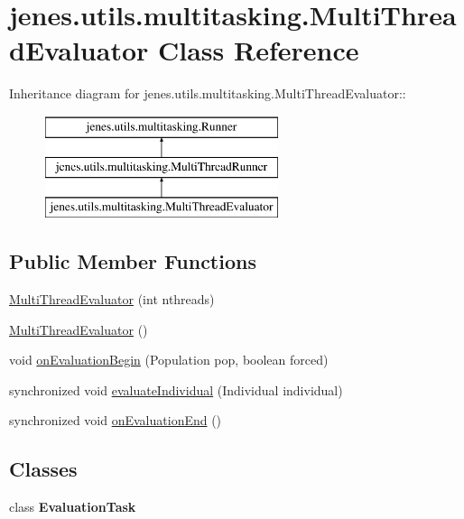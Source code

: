 \hypertarget{classjenes_1_1utils_1_1multitasking_1_1_multi_thread_evaluator}{
\section{jenes.utils.multitasking.MultiThreadEvaluator Class Reference}
\label{classjenes_1_1utils_1_1multitasking_1_1_multi_thread_evaluator}
}
Inheritance diagram for jenes.utils.multitasking.MultiThreadEvaluator::\begin{figure}[H]
\begin{center}
\leavevmode
\includegraphics[height=3cm]{classjenes_1_1utils_1_1multitasking_1_1_multi_thread_evaluator}
\end{center}
\end{figure}
\subsection*{Public Member Functions}
\begin{CompactItemize}
\item 
\hyperlink{classjenes_1_1utils_1_1multitasking_1_1_multi_thread_evaluator_842d648ae03a8d7f835a24c522d229ae}{MultiThreadEvaluator} (int nthreads)
\item 
\hyperlink{classjenes_1_1utils_1_1multitasking_1_1_multi_thread_evaluator_c9949bf8de0efb0cb47feb2df56140ff}{MultiThreadEvaluator} ()
\item 
void \hyperlink{classjenes_1_1utils_1_1multitasking_1_1_multi_thread_evaluator_2a9d9427ca8c2b8a9dfc541c85bada42}{onEvaluationBegin} (Population pop, boolean forced)
\item 
synchronized void \hyperlink{classjenes_1_1utils_1_1multitasking_1_1_multi_thread_evaluator_d99c13b137f1089a9f30377548b42e25}{evaluateIndividual} (Individual individual)
\item 
synchronized void \hyperlink{classjenes_1_1utils_1_1multitasking_1_1_multi_thread_evaluator_3cd56b43989da43e4b3c2b79260d5f5f}{onEvaluationEnd} ()
\end{CompactItemize}
\subsection*{Classes}
\begin{CompactItemize}
\item 
class \textbf{EvaluationTask}
\end{CompactItemize}


